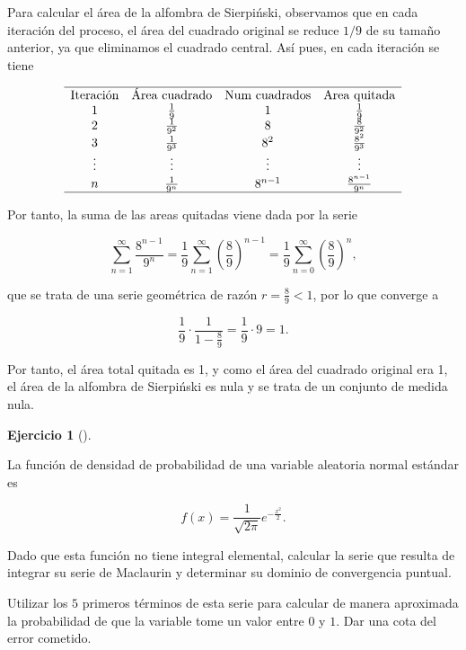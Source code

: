 \documentclass[
  a4paper,
]{scrreport}
\theoremstyle{definition}
\newtheorem{exercise}{Ejercicio}[chapter]
\theoremstyle{remark}
\begin{document}
\begin{tcolorbox}[enhanced jigsaw, opacityback=0, bottomtitle=1mm, coltitle=black, opacitybacktitle=0.6, colback=white, breakable, left=2mm, titlerule=0mm, bottomrule=.15mm, colbacktitle=quarto-callout-tip-color!10!white, toprule=.15mm, leftrule=.75mm, arc=.35mm, toptitle=1mm, colframe=quarto-callout-tip-color-frame, title=\textcolor{quarto-callout-tip-color}{\faLightbulb}\hspace{0.5em}{Solución}, rightrule=.15mm]

Para calcular el área de la alfombra de Sierpiński, observamos que en
cada iteración del proceso, el área del cuadrado original se reduce
\(1/9\) de su tamaño anterior, ya que eliminamos el cuadrado central.
Así pues, en cada iteración se tiene

\[
\begin{array}{cccc}
\hline
\mbox{Iteración} & \mbox{Área cuadrado} & \mbox{Num cuadrados} & \mbox{Area quitada} \\
1 & \frac{1}{9} & 1 & \frac{1}{9} \\
2 & \frac{1}{9^2} & 8 & \frac{8}{9^2} \\
3 & \frac{1}{9^3} & 8^2 & \frac{8^2}{9^3} \\
\vdots & \vdots & \vdots & \vdots \\
n & \frac{1}{9^n} & 8^{n-1} & \frac{8^{n-1}}{9^n} \\
\hline
\end{array}
\]

Por tanto, la suma de las areas quitadas viene dada por la serie

\[
\sum_{n=1}^\infty \frac{8^{n-1}}{9^n} 
= \frac{1}{9}\sum_{n=1}^\infty \left(\frac{8}{9}\right)^{n-1}
= \frac{1}{9}\sum_{n=0}^\infty \left(\frac{8}{9}\right)^n,
\]

que se trata de una serie geométrica de razón \(r = \frac{8}{9} < 1\),
por lo que converge a

\[
\frac{1}{9} \cdot \frac{1}{1 - \frac{8}{9}} = \frac{1}{9} \cdot 9 = 1.
\]

Por tanto, el área total quitada es 1, y como el área del cuadrado
original era 1, el área de la alfombra de Sierpiński es nula y se trata
de un conjunto de medida nula.

\end{tcolorbox}

\begin{exercise}[]\protect\hypertarget{exr-6}{}\label{exr-6}

La función de densidad de probabilidad de una variable aleatoria normal
estándar es

\[
f(x) = \frac{1}{\sqrt{2\pi}}e^{-\frac{x^2}{2}}.
\]

Dado que esta función no tiene integral elemental, calcular la serie que
resulta de integrar su serie de Maclaurin y determinar su dominio de
convergencia puntual.

Utilizar los \(5\) primeros términos de esta serie para calcular de
manera aproximada la probabilidad de que la variable tome un valor entre
\(0\) y \(1\). Dar una cota del error cometido.

\end{exercise}
\end{document}
